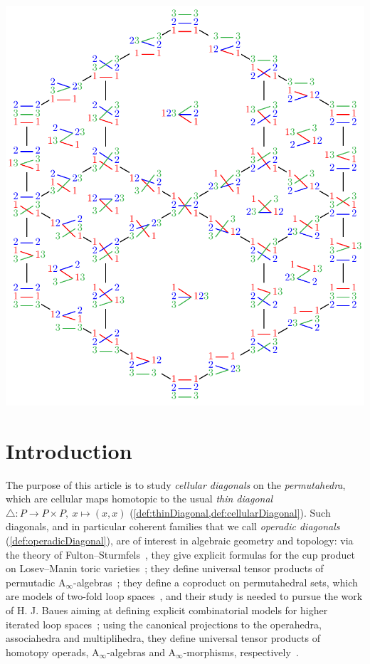 \documentclass{amsart}
\theoremstyle{definition}
\newcommand{\Ainf}{\ensuremath{\mathrm{A}_\infty}}
\begin{document}
\vspace*{-.4cm}
\centerline{\includegraphics[scale=.75]{diagonalPermutahedron3}}
\vspace*{-.2cm}

\newpage
\enlargethispage{1cm}
\tableofcontents


\newpage
\section*{Introduction} 
\label{s:introduction}

The purpose of this article is to study \emph{cellular diagonals} on the \emph{permutahedra}, which are cellular maps homotopic to the usual \emph{thin diagonal} $\triangle : P \to P \times P,~ x \mapsto (x,x)$ (\cref{def:thinDiagonal,def:cellularDiagonal}).
Such diagonals, and in particular coherent families that we call \emph{operadic diagonals} (\cref{def:operadicDiagonal}), are of interest in algebraic geometry and topology: via the theory of Fulton--Sturmfels~\cite{FultonSturmfels}, they give explicit formulas for the cup product on Losev--Manin toric varieties~\cite{LosevManin}; they define universal tensor products of permutadic $\Ainf$-algebras~\cite{LodayRonco-permutads,Markl}; they define a coproduct on permutahedral sets, which are models of two-fold loop spaces~\cite{SaneblidzeUmble}, and their study is needed to pursue the work of H. J. Baues aiming at defining explicit combinatorial models for higher iterated loop spaces~\cite{Baues}; using the canonical projections to the operahedra, associahedra and multiplihedra, they define universal tensor products of homotopy operads, $\Ainf$-algebras and $\Ainf$-morphisms, respectively~\cite{LaplanteAnfossi,LaplanteAnfossiMazuir}.
\end{document}
